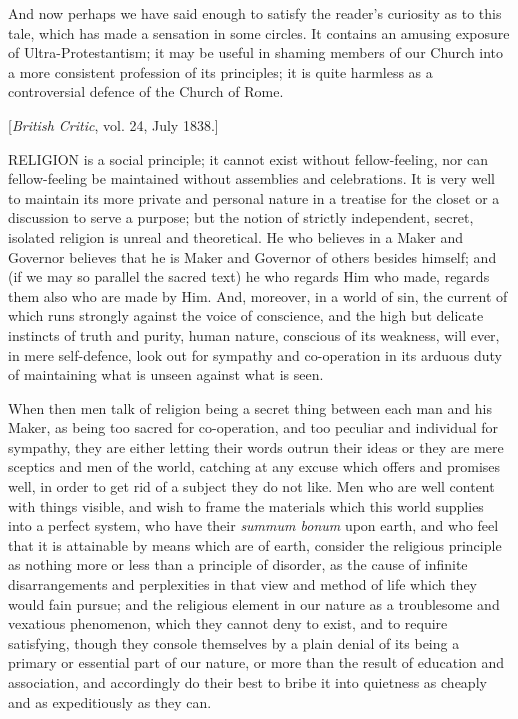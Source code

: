 And now perhaps we have said enough to satisfy the
reader's curiosity as to this tale, which has made a sensation in some
circles. It contains an amusing exposure of Ultra-Protestantism; it
may be useful in shaming members of our Church into a more consistent
profession of its principles; it is quite harmless as a controversial
defence of the Church of Rome.


[\emph{British
Critic}, vol. 24, July 1838.]

RELIGION
is a social principle; it cannot exist without fellow-feeling, nor can
fellow-feeling be maintained without assemblies and celebrations. It is
very well to maintain its more private and personal nature in a treatise
for the closet or a discussion to serve a purpose; but the notion of
strictly independent, secret, isolated religion is unreal and
theoretical. He who believes in a Maker and Governor believes that he is
Maker and Governor of others besides himself; and (if we may so parallel
the sacred text) he who regards Him who made, regards them also who are
made by Him. And, moreover, in a world of sin, the current of which runs
strongly against the voice of conscience, and the high but delicate
instincts of truth and purity, human nature, conscious of its weakness,
will ever, in mere self-defence, look out for sympathy and co-operation
in its arduous duty of maintaining what is unseen against what is seen.

When then
men talk of religion being a secret thing between each man and his
Maker, as being too sacred for co-operation, and too peculiar and
individual for sympathy, they are either letting their words outrun
their ideas or they are mere sceptics and men of the world, catching at
any excuse which offers and promises well, in order to get rid of a
subject they do not like. Men who are well content with things visible,
and wish to frame the materials which this world supplies into a perfect
system, who have their \emph{summum bonum} upon earth, and who feel that
it is attainable by means which are of earth, consider the religious
principle as nothing more or less than a principle of disorder, as
the cause of infinite disarrangements and perplexities in that view and
method of life which they would fain pursue; and the religious element
in our nature as a troublesome and vexatious phenomenon, which they
cannot deny to exist, and to require satisfying, though they console
themselves by a plain denial of its being a primary or essential part of
our nature, or more than the result of education and association, and
accordingly do their best to bribe it into quietness as cheaply and as
expeditiously as they can.

